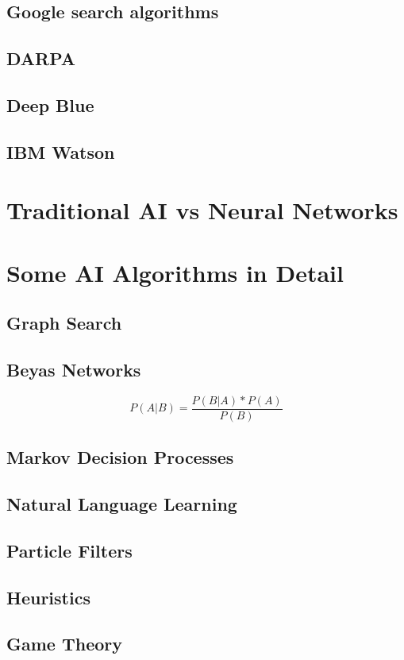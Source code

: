 \subsection{Google search algorithms}
\subsection{DARPA}
\subsection{Deep Blue}
\subsection{IBM Watson}

\section{Traditional AI vs Neural Networks}

\newpage
\section{Some AI Algorithms in Detail}
\subsection{Graph Search}
\subsection{Beyas Networks}

\[P(A|B)=\frac{P(B|A) * P(A)}{P(B)}\]

\subsection{Markov Decision Processes}
\subsection{Natural Language Learning}
\subsection{Particle Filters}
\subsection{Heuristics}
\subsection{Game Theory}

